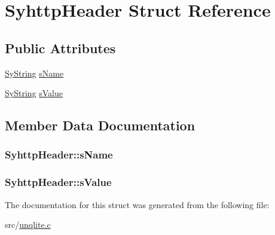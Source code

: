 \hypertarget{struct_syhttp_header}{\section{Syhttp\-Header Struct Reference}
\label{df/d9c/struct_syhttp_header}
}
\subsection*{Public Attributes}
\begin{DoxyCompactItemize}
\item 
\hyperlink{struct_sy_string}{Sy\-String} \hyperlink{struct_syhttp_header_a72cef3260f8cb88eebb1e44c254659e1}{s\-Name}
\item 
\hyperlink{struct_sy_string}{Sy\-String} \hyperlink{struct_syhttp_header_a4b48ee42aa72df4976c95eb99327b3a4}{s\-Value}
\end{DoxyCompactItemize}


\subsection{Member Data Documentation}
\hypertarget{struct_syhttp_header_a72cef3260f8cb88eebb1e44c254659e1}{
\subsubsection[{s\-Name}]{ Syhttp\-Header\-::s\-Name}}\label{df/d9c/struct_syhttp_header_a72cef3260f8cb88eebb1e44c254659e1}
\hypertarget{struct_syhttp_header_a4b48ee42aa72df4976c95eb99327b3a4}{
\subsubsection[{s\-Value}]{ Syhttp\-Header\-::s\-Value}}\label{df/d9c/struct_syhttp_header_a4b48ee42aa72df4976c95eb99327b3a4}


The documentation for this struct was generated from the following file\-:\begin{DoxyCompactItemize}
\item 
src/\hyperlink{unqlite_8c}{unqlite.\-c}\end{DoxyCompactItemize}
